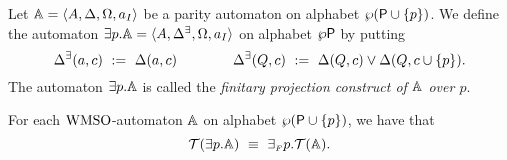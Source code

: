 
\begin{definition}\label{DEF_fin_projection}
Let $\mathbb{A} = \langle{A, \Delta, \Omega, a_I}\rangle$ be a parity automaton on alphabet $\wp(\mathsf{P} \cup \{p\})$. We define the automaton ${{\exists} p}.\mathbb{A} = \langle{A, \Delta^\exists, \Omega, a_I}\rangle$ on alphabet $\wp\mathsf{P}$ by putting
\begin{equation*}
  \Delta^\exists(a,c) \ \mathrel{: =} \ \Delta(a,c) \qquad \qquad
  \Delta^\exists(Q,c) \ \mathrel{: =} \ \Delta(Q,c) \vee \Delta(Q,c\cup\{p\}).
\end{equation*}
The automaton ${{\exists} p}.\mathbb{A}$ is called the \emph{finitary projection
construct of $\mathbb{A}$ over $p$}.
\end{definition}


\begin{lemma}\label{PROP_fin_projection}
For each $\mathrm{WMSO}$-automaton $\mathbb{A}$ on alphabet $\wp (\mathsf{P} \cup \{p\})$,
we have that
$$\mathcal{T}({{\exists} p}.\mathbb{A}) \ \equiv\
{{\exists_{{\scriptscriptstyle F}}} p}.\mathcal{T}(\mathbb{A}).
$$
\end{lemma}


